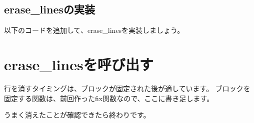 \subsection{erase\_linesの実装}
以下のコードを追加して、erase\_linesを実装しましょう。


\section{erase\_linesを呼び出す}
行を消すタイミングは、ブロックが固定された後が適しています。
ブロックを固定する関数は、前回作ったfix関数なので、ここに書き足します。

うまく消えたことが確認できたら終わりです。